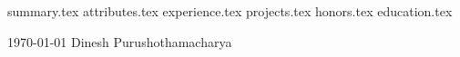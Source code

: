 \documentclass[18pt, a4paper]{awesome-cv}
\newcommand*{\sectiondir}{resume/}
\begin{document}
\makecvheader

{summary.tex}
{attributes.tex}
{experience.tex}
{projects.tex}
{honors.tex}
{education.tex}


\makecvfooter
  {\today}
  {Dinesh Purushothamacharya}
  {\thepage}
\end{document}
